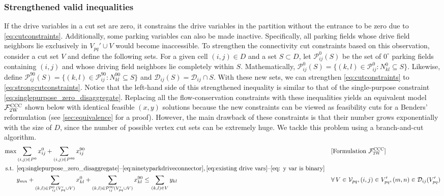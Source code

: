 \documentclass[10pt]{article}
\newcommand{\zeroparkvar}[2]{x^{0}_{#1#2}}
\newcommand{\ninetyparkvar}[2]{x^{90}_{#1#2}}
\newcommand{\drivevar}[2]{y_{#1#2}}
\newcommand{\validzeroparkset}{P^{0}}
\newcommand{\validninetyparkset}{P^{90}}
\newcommand{\validdriveset}{D}
\newcommand{\zeroneighborset}[2]{N_{#1#2}^{0}}
\newcommand{\ninetyneighborset}[2]{N_{#1#2}^{90}}
\newcommand{\invzeroparkset}[2]{\mathcal{P}_{#1#2}^{0}}
\newcommand{\invninetyparkset}[2]{\mathcal{P}_{#1#2}^{90}}
\newcommand{\invdriveset}[2]{\mathcal{D}_{#1#2}}
\newcommand{\entrancex}{p}
\newcommand{\entrancey}{q}
\newcommand{\vertexpartitions}[1]{\mathcal{V}_{#1}}
\newcommand{\vertexcutset}{V}
\newcommand{\twowaypartitioncomp}[1]{V_{#1}'}
\newcommand{\invzeroparksetcut}[3]{\mathcal{P}^{0}_{#1#2}(#3)}
\newcommand{\invninetyparksetcut}[3]{\mathcal{P}_{#1#2}^{90}(#3)}
\newcommand{\invdrivesetcut}[3]{\mathcal{D}_{#1#2}(#3)}
\theoremstyle{definition}
\begin{document}
\subsubsection{Strengthened valid inequalities}
\label{sec:vis_two_way}
If the drive variables in a cut set are zero, it constrains the drive variables in the partition without the entrance to be zero due to \eqref{eq:cutconstraints}. Additionally, some parking variables can also be made inactive. Specifically, all parking fields whose drive field neighbors lie exclusively in $\twowaypartitioncomp{\entrancex \entrancey} \cup \vertexcutset$ would become inaccessible. To strengthen the connectivity cut constraints based on this observation, consider a cut set $\vertexcutset$ and define the following sets. For a given cell $(i, j) \in \validdriveset$ and a set $S \subset \validdriveset$, let $\invzeroparksetcut{i}{j}{S}$ be the set of $0^{\circ}$ parking fields containing $(i, j)$ and whose driving field neighbors lie completely within $S$. Mathematically, $\invzeroparksetcut{i}{j}{S} = \{(k, l) \in \invzeroparkset{i}{j} : \zeroneighborset{k}{l} \subseteq S \}$. Likewise, define $\invninetyparksetcut{i}{j}{S} = \{(k, l) \in \invninetyparkset{i}{j} : \ninetyneighborset{k}{l} \subseteq S\}$ and $\invdrivesetcut{i}{j}{S} = \invdriveset{i}{j} \cap S $. With these new sets, we can strengthen \eqref{eq:cutconstraints} to \eqref{eq:strongcutconstraints}. Notice that the left-hand side of this strengthened inequality is similar to that of the single-purpose constraint \eqref{eq:singlepurpose_zero_disaggregate}. Replacing all the flow-conservation constraints with these inequalities yields an equivalent model $\mathcal{F}^{\textsc{CCC}}_{\textsc{2W}}$ shown below with identical feasible $(x, y)$ solutions because the new constraints can be viewed as feasibility cuts for a Benders' reformulation (see \ref{sec:equivalence} for a proof). However, the main drawback of these constraints is that their number grows exponentially with the size of $\validdriveset$, since the number of possible vertex cut sets can be extremely huge. We tackle this problem using a branch-and-cut algorithm.
\begin{align}
    \max & \sum_{(i,j) \in \validzeroparkset} \zeroparkvar{i}{j} + \sum_{(i,j) \in \validninetyparkset} \ninetyparkvar{i}{j}  && [\text{Formulation } \mathcal{F}^{\textsc{CCC}}_{\textsc{2W}}] \notag\\
      \text{s.t. }  & \eqref{eq:singlepurpose_zero_disaggregate}\text{--}\eqref{eq:ninetyparkdriveconnector}, \eqref{eq:existing drive vars}\text{--}\eqref{eq: y var is binary} && \notag \\
    & \drivevar{m}{n} + \sum_{(k, l) \in \invzeroparksetcut{i}{j}{{\twowaypartitioncomp{\entrancex \entrancey} \cup \vertexcutset}}} \zeroparkvar{k}{l} + \sum_{(k, l) \in \invninetyparksetcut{i}{j}{\twowaypartitioncomp{\entrancex \entrancey} \cup \vertexcutset}} \ninetyparkvar{k}{l} \leq \sum_{(k,l) \in \vertexcutset} \drivevar{k}{l} \qquad && \forall \, \vertexcutset \in \vertexpartitions{pq}, (i, j) \in \twowaypartitioncomp{\entrancex \entrancey}, (m, n) \in \invdrivesetcut{i}{j}{\twowaypartitioncomp{\entrancex \entrancey}}   \label{eq:strongcutconstraints}
\end{align}
\end{document}
